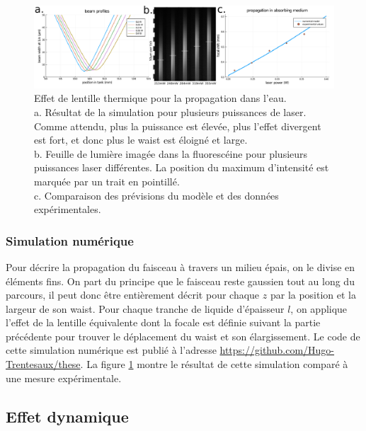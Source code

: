 \begin{figure}
\centering
\includegraphics[width=\textwidth]{./files/thermal_shift_model.svg.png}
\caption{Effet de lentille thermique pour la propagation dans l'eau.
\\a. Résultat de la simulation pour plusieurs puissances de laser. Comme attendu, plus la puissance est élevée, plus l'effet divergent est fort, et donc plus le waist est éloigné et large.
\\b. Feuille de lumière imagée dans la fluorescéine pour plusieurs puissances laser différentes. La position du maximum d'intensité est marquée par un trait en pointillé.
\\c. Comparaison des prévisions du modèle et des données expérimentales.
\label{FIGthermalfluorescine}
}
\end{figure}

\subsubsection{Simulation numérique}\label{simulationthermallens}

Pour décrire la propagation du faisceau à travers un milieu épais, on le divise en éléments fins.
On part du principe que le faisceau reste gaussien tout au long du parcours, il peut donc être entièrement décrit pour chaque $z$ par la position et la largeur de son waist. Pour chaque tranche de liquide d'épaisseur $l$, on applique l'effet de la lentille équivalente dont la focale est définie suivant la partie précédente pour trouver le déplacement du waist et son élargissement. Le code de cette simulation numérique est publié à l'adresse \href{https://github.com/Hugo-Trentesaux/these}{https://github.com/Hugo-Trentesaux/these}. La figure \ref{FIGthermalfluorescine} montre le résultat de cette simulation comparé à une mesure expérimentale.


\subsection{Effet dynamique}

